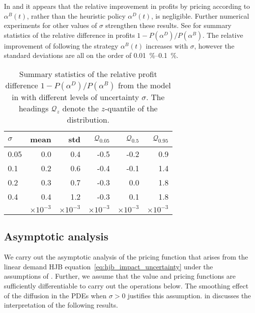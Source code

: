 \documentclass[main.tex]{subfiles}
\begin{document}
In  and
 it appears that the relative
improvement in profits by pricing according to $\alpha^B(t)$, rather than the heuristic
policy $\alpha^D(t)$, is negligible.
Further numerical experiments for other values of $\sigma$ strengthen
these results. See  for summary
statistics of the relative difference in profits
$1-P(\alpha^D)/P(\alpha^B)$.
The relative improvement of following the strategy $\alpha^B(t)$
increases with $\sigma$, however the standard deviations are all on
the order of \SIrange{0.01}{0.1}{\percent}.
\begin{table}[htb]
  \centering
  \begin{tabular}{lrrrrr}
    \toprule
    $\sigma$ & mean & std & $\mathcal{Q}_{0.05}$ & $\mathcal{Q}_{0.5}$ & $\mathcal{Q}_{0.95}$\\
    \midrule
    0.05& 0.0 & 0.4 &-0.5&-0.2&0.9\\
    0.1&0.2& 0.6&-0.4&-0.1&1.4\\
    0.2&0.3& 0.7&-0.3&0.0&1.8\\
    0.4&0.4& 1.2&-0.3&0.1&1.8\\
    \midrule
             & $\times 10^{-3}$&$\times 10^{-3}$&$\times 10^{-3}$&$\times 10^{-3}$&$\times 10^{-3}$\\
    \bottomrule
  \end{tabular}
  \caption{Summary statistics of the relative profit difference
    $1-P(\alpha^D)/P(\alpha^B)$ from the model in
     with different levels of
    uncertainty $\sigma$.
    The headings $\mathcal{Q}_z$ denote the $z$-quantile of the distribution.
  }\label{tbl:profit_hjb_cec_statistics}
\end{table}

\subsection{Asymptotic analysis}\label{subsec:asymptotic_analysis}
We carry out the asymptotic analysis of the pricing function
that arises from the linear demand HJB
equation~\eqref{eq:hjb_impact_uncertainty} under the assumptions of
.
Further, we assume that the value and pricing functions are sufficiently
differentiable to carry out the operations below. The smoothing effect
of the diffusion in the PDEs when $\sigma>0$ justifies this assumption.
 in 
discusses the interpretation of the following results.
\end{document}
